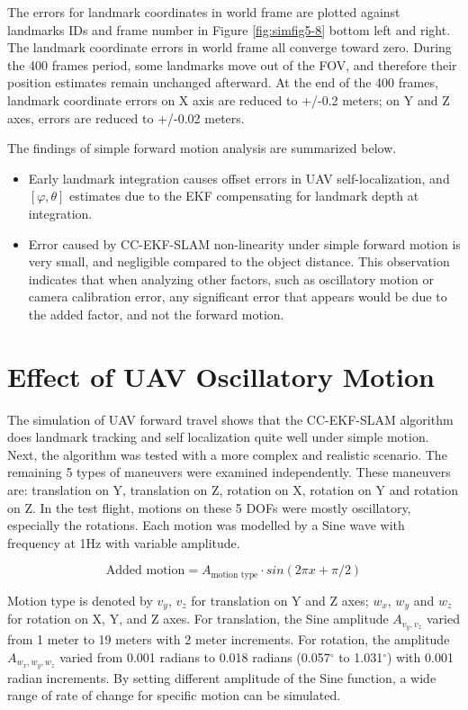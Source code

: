 The errors for landmark coordinates in world frame are plotted
against landmarks IDs and frame number in Figure \ref{fig:simfig5-8}
bottom left and right. The landmark coordinate errors in world frame
all converge toward zero. During the 400 frames period, some
landmarks move out of the FOV, and therefore their position estimates
remain unchanged afterward. At the end of the 400 frames, landmark
coordinate errors on X axis are reduced to +/-0.2 meters; on Y and Z axes,
errors are reduced to +/-0.02 meters. 

The findings of simple forward motion analysis are summarized below.
\begin{itemize}
  \item Early landmark integration causes offset errors in UAV
  self-localization, and $[\varphi, \theta]$ estimates due to the EKF
  compensating for landmark depth at integration.
  \item Error caused by CC-EKF-SLAM non-linearity under simple forward
  motion is very small, and negligible compared to the object
  distance. This observation indicates that when analyzing other
  factors, such as oscillatory motion or camera calibration error,
  any significant error that appears would be due to the added factor,
  and not the forward motion.
\end{itemize}
\FloatBarrier

\section{Effect of UAV Oscillatory Motion}
The simulation of UAV forward travel shows that the CC-EKF-SLAM
algorithm does landmark tracking and self localization quite well
under simple motion. Next, the algorithm was tested with a more
complex and realistic scenario. The remaining 5 types of maneuvers
were examined independently. These maneuvers are: translation on Y,
translation on Z, rotation on X, rotation on Y and rotation on Z. In
the test flight, motions on these 5 DOFs were mostly oscillatory,
especially the rotations. Each motion was modelled by a Sine wave with
frequency at 1Hz with variable amplitude.

$$\text{Added motion} = A_{\text{motion type}}\cdot sin(2\pi x+\pi/2)$$

Motion type is denoted by $v_y$, $v_z$ for translation on Y and Z
axes; $w_x$, $w_y$ and $w_z$ for rotation on X, Y, and Z axes. For
translation, the Sine amplitude $A_{v_y,v_z}$ varied from 1 meter to
19 meters with 2 meter increments. For rotation, the amplitude
$A_{w_x,w_y,w_z}$ varied from 0.001 radians to 0.018 radians
(0.057$^\circ$ to 1.031$^\circ$) with 0.001 radian increments. By
setting different amplitude of the Sine function, a wide range of
rate of change for specific motion can be simulated. 

